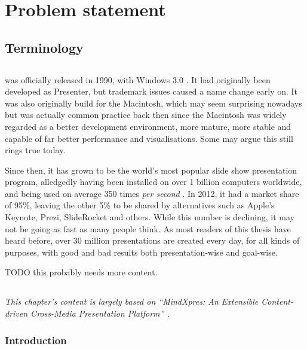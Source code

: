 
 \chapter{Problem statement}

  \section{Terminology}

  \section{\ppt}

   \ppt was officially released in 1990, with Windows 3.0 \citep{austin-1}. It
   had originally been developed as Presenter, but trademark issues caused a
   name change early on. It was also originally build for the Macintosh, which
   may seem surprising nowadays but was actually common practice back then
   since the Macintosh was widely regarded as a better development environment,
   more mature, more stable and capable of far better performance and
   visualisations. Some may argue this still rings true today.

   Since then, it has grown to be the world's most popular slide show
   presentation program, alledgedly having been installed on over 1 billion
   computers worldwide, and being used on average 350 times \emph{per second}
   \citep{parks-1}. In 2012, it had a market share of 95\%, leaving the other
   5\% to be shared by alternatives such as Apple's Keynote, Prezi, SlideRocket
   and others. While this number is declining, it may not be going as fast as
   many people think. As most readers of this thesis have heard before, over 30
   million \ppt presentations are created every day, for all kinds of purposes,
   with good and bad results both presentation-wise and goal-wise.

   TODO this probably needs more content.

  \section{\mxp}

   \emph{This chapter's content is largely based on ``MindXpres: An Extensible
   Content-driven Cross-Media Presentation Platform'' \citep{roels-1}.}

   \subsection{Introduction}

